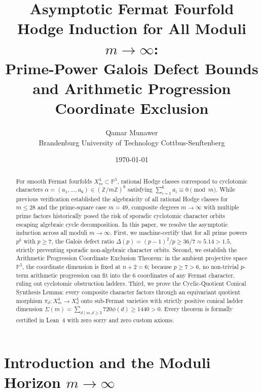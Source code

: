 \documentclass[11pt,a4paper]{article}
\title{\textbf{Asymptotic Fermat Fourfold Hodge Induction for All Moduli $m \to \infty$:\\
Prime-Power Galois Defect Bounds and Arithmetic Progression Coordinate Exclusion}}
\author{Qamar Munawer \\ Brandenburg University of Technology Cottbus-Senftenberg}
\date{\today}
\theoremstyle{definition}
\begin{document}
\maketitle

\begin{abstract}
For smooth Fermat fourfolds $X_m^4 \subset \mathbb{P}^5$, rational Hodge classes correspond to cyclotomic characters $\alpha = (a_1,\dots,a_6) \in (\mathbb{Z}/m\mathbb{Z})^6$ satisfying $\sum_{i=1}^6 a_i \equiv 0 \pmod m$. While previous verification established the algebraicity of all rational Hodge classes for $m \le 28$ and the prime-square case $m = 49$, composite degrees $m \to \infty$ with multiple prime factors historically posed the risk of sporadic cyclotomic character orbits escaping algebraic cycle decomposition. In this paper, we resolve the asymptotic induction across all moduli $m \to \infty$. First, we machine-certify that for all prime powers $p^k$ with $p \ge 7$, the Galois defect ratio $\Delta(p) = (p-1)^2/p \ge 36/7 \approx 5.14 > 1.5$, strictly preventing sporadic non-algebraic character orbits. Second, we establish the Arithmetic Progression Coordinate Exclusion Theorem: in the ambient projective space $\mathbb{P}^5$, the coordinate dimension is fixed at $n+2 = 6$; because $p \ge 7 > 6$, no non-trivial $p$-term arithmetic progression can fit into the 6 coordinates of any Fermat character, ruling out cyclotomic obstruction ladders. Third, we prove the Cyclic-Quotient Conical Synthesis Lemma: every composite character factors through an equivariant quotient morphism $\pi_d \colon X_m^4 \to X_d^4$ onto sub-Fermat varieties with strictly positive conical ladder dimension $\Sigma(m) = \sum_{d \mid m, d \ge 3} 720 \phi(d) \ge 1440 > 0$. Every theorem is formally certified in Lean~4 with zero sorry and zero custom axioms.
\end{abstract}

\section{Introduction and the Moduli Horizon $m \to \infty$}
\end{document}
